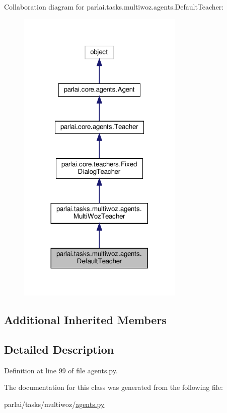 Collaboration diagram for parlai.\+tasks.\+multiwoz.\+agents.\+Default\+Teacher\+:
\nopagebreak
\begin{figure}[H]
\begin{center}
\leavevmode
\includegraphics[width=224pt]{d8/d97/classparlai_1_1tasks_1_1multiwoz_1_1agents_1_1DefaultTeacher__coll__graph}
\end{center}
\end{figure}
\subsection*{Additional Inherited Members}


\subsection{Detailed Description}


Definition at line 99 of file agents.\+py.



The documentation for this class was generated from the following file\+:\begin{DoxyCompactItemize}
\item 
parlai/tasks/multiwoz/\hyperlink{parlai_2tasks_2multiwoz_2agents_8py}{agents.\+py}\end{DoxyCompactItemize}
